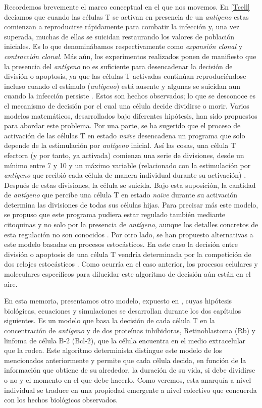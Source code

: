 Recordemos brevemente el marco conceptual en el que nos movemos. En \ref{Tcell} decíamos que cuando las células T se activan en presencia de un \textit{antígeno} estas comienzan a reproducirse rápidamente para combatir la infección y, una vez superada, muchas de ellas se suicidan restaurando los valores de población iniciales. Es lo que denominábamos respectivamente como \textit{expansión clonal} y \textit{contracción clonal}. Más aún, los experimentos realizados ponen de manifiesto que la presencia del \textit{antígeno} no es suficiente para desencadenar la decisión de división o apoptosis, ya que las células T activadas continúan reproduciéndose incluso cuando el estímulo (\textit{antígeno}) está ausente y algunas se suicidan aun cuando la infección persiste \citep{JTB}. Estos son hechos observados; lo que se desconoce es el mecanismo de decisión por el cual una célula decide dividirse o morir. Varios modelos matemáticos, desarrollados bajo diferentes hipótesis, han sido propuestos para abordar este problema. Por una parte, se ha sugerido que el proceso de activación de las células T en estado \textit{naïve} desencadena un programa que solo depende de la estimulación por \textit{antígeno} inicial. Así las cosas, una célula T efectora (y por tanto, ya activada) comienza una serie de divisiones, desde un mínimo entre 7 y 10 y un máximo variable (relacionado con la estimulación por \textit{antígeno} que recibió cada célula de manera individual durante su activación) \citep{Hawkins5032}. Después de estas divisiones, la célula se suicida. Bajo esta suposición, la cantidad de \textit{antígeno} que percibe una célula T en estado \textit{naïve} durante su activación determina las divisiones de todas sus células hijas. Para precisar más este modelo, se propuso que este programa pudiera estar regulado también mediante citoquinas y no solo por la presencia de \textit{antígeno}, aunque los detalles concretos de esta regulación no son conocidos \citep{JTB}. Por otro lado, se han propuesto alternativas a este modelo basadas en procesos estocásticos. En este caso la decisión entre división o apoptosis de una célula T vendría determinada por la competición de dos relojes estocásticos \citep{DUFFY2012457}. Como ocurría en el caso anterior, los procesos celulares y moleculares específicos para dilucidar este algoritmo de decisión aún están en el aire. 

En esta memoria, presentamos otro modelo, expuesto en \cite{JTB}, cuyas hipótesis biológicas, ecuaciones y simulaciones se desarrollan durante los dos capítulos siguientes. Es un modelo que basa la decisión de cada célula T en la concentración de \textit{antígeno} y de dos proteínas inhibidoras, Retinoblastoma (Rb) y linfoma de célula B-2 (Bcl-2), que la célula encuentra en el medio extracelular que la rodea. Este algoritmo determinista distingue este modelo de los mencionados anteriormente y permite que cada célula decida, en función de la información que obtiene de su alrededor, la duración de su vida, si debe dividirse o no y el momento en el que debe hacerlo. Como veremos, esta anarquía a nivel individual se traduce en una propiedad emergente a nivel colectivo que concuerda con los hechos biológicos observados. 


